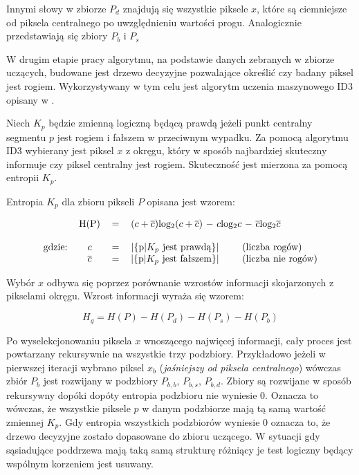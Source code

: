 Innymi słowy w zbiorze $P_d$ znajdują się wszystkie piksele $x$, które są ciemniejsze od piksela centralnego po uwzględnieniu wartości progu. Analogicznie przedstawiają się zbiory $P_b$ i $P_s$


W drugim etapie pracy algorytmu, na podstawie danych zebranych w zbiorze uczących, budowane jest drzewo decyzyjne pozwalające określić czy badany piksel jest rogiem. Wykorzystywany w tym celu jest algorytm uczenia maszynowego ID3 opisany w \cite{ID3}.

Niech $K_p$ będzie zmienną logiczną będącą prawdą jeżeli punkt centralny segmentu $p$ jest rogiem i fałszem w przeciwnym wypadku. Za pomocą algorytmu ID3 wybierany jest piksel $x$ z okręgu, który w sposób najbardziej skuteczny informuje czy piksel centralny jest rogiem. Skuteczność jest mierzona za pomocą entropii $K_p$.

Entropia $K_p$ dla zbioru pikseli $P$ opisana jest wzorem:

\begin{equation}
\begin{tabular}{cccccl}
         & H(P)& = & \multicolumn{3}{l}{($c+\overline{c}$)log$_2$($c+\overline{c}$) $-$ $c$log$_2$$c$ $-$ $\overline{c}$log$_2$$\overline{c}$} \\
&&&&&\\
gdzie: & $c$            & = &  |\{p|$K_p$ jest prawdą\}|& &(liczba rogów) \\
$      $ & $\overline{c}$ & = &  |\{p|$K_p$ jest fałszem\}| & &(liczba nie rogów)  \\
\end{tabular}
\end{equation}

Wybór $x$ odbywa się poprzez porównanie wzrostów informacji skojarzonych z pikselami okręgu. Wzrost informacji wyraża się wzorem:

\begin{equation}
H_g = H(P) - H(P_d) - H(P_s) - H(P_b)
\end{equation}

Po wyselekcjonowaniu piksela $x$ wnoszącego najwięcej informacji, cały proces jest powtarzany rekursywnie na wszystkie trzy podzbiory. Przykładowo jeżeli w pierwszej iteracji wybrano piksel $x_b$ (\textit{jaśniejszy od piksela centralnego}) wówczas zbiór $P_{b}$ jest rozwijany w podzbiory $P_{b,b}$, $P_{b,s}$, $P_{b,d}$. Zbiory są rozwijane w sposób rekursywny dopóki dopóty entropia podzbioru nie wyniesie 0. Oznacza to wówczas, że wszystkie piksele $p$ w danym podzbiorze mają tą samą wartość zmiennej $K_p$. Gdy entropia wszystkich podzbiorów wyniesie 0 oznacza to, że drzewo decyzyjne zostało dopasowane do zbioru uczącego. W sytuacji gdy sąsiadujące poddrzewa mają taką samą strukturę różniący je test logiczny będący wspólnym korzeniem jest usuwany.

